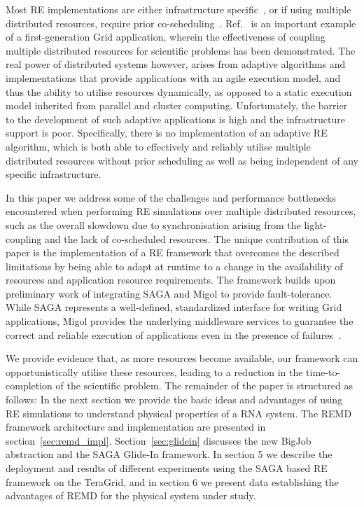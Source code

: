 \documentclass{rspublic}
\begin{document}
Most RE implementations are either infrastructure
specific~\citep{Woods:2005nx}, or if using multiple distributed
resources, require prior co-scheduling~\citep{repex_mpig}.
Ref.~\citep{repex_mpig} is an important example of a first-generation
Grid application, wherein the effectiveness of coupling multiple
distributed resources for scientific problems has been demonstrated.
The real power of distributed systems however, arises from adaptive
algorithms and implementations that provide applications with an agile
execution model, and thus the ability to utilise resources
dynamically, as opposed to a static execution model inherited from
parallel and cluster computing.  Unfortunately, the barrier to the
development of such adaptive applications is high and the
infrastructure support is poor.
Specifically, there is no implementation of an
adaptive RE algorithm, which is both able to effectively and reliably
utilise multiple distributed resources without prior scheduling as
well as being independent of any specific %
infrastructure.

In this paper we address some of the challenges and performance
bottlenecks encountered when performing RE simulations over multiple
distributed resources, such as the overall slowdown due to
synchronisation arising from the light-coupling and the lack of
co-scheduled resources.  The unique contribution of this paper is the
implementation of a RE framework that overcomes the described
limitations by being able to adapt at runtime to a change in the
availability of resources and application resource requirements.  The
framework builds upon preliminary work of integrating SAGA and Migol to
provide fault-tolerance.
While SAGA represents a well-defined, standardized interface for writing
Grid applications, Migol provides the underlying middleware services
to guarantee the correct and reliable exe\-cution of applications even
in the presence of failures~\citep{Luckow:2008la}.

We provide evidence that, as more resources become
available, our framework can opportunistically utilise these resources,
leading to a reduction in the time-to-completion of the scientific
problem.  The remainder of the paper is structured as follows: In the
next section we provide the basic ideas and advantages of using RE
simulations to understand physical properties of a RNA system. The REMD
framework architecture and implementation are 
presented in section~\ref{sec:remd_impl}. 
Section~\ref{sec:glidein} discusses the new BigJob
abstraction and the SAGA Glide-In framework.  
In section 5 we describe the deployment and results of different experiments
using the SAGA based RE framework on the TeraGrid, and in section 6 we
present data establishing the advantages of REMD for the physical
system under study. 
\end{document}
